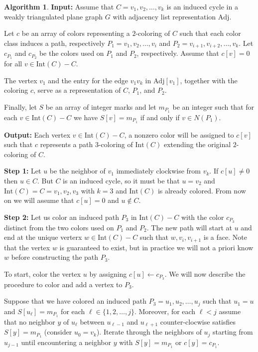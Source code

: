 \documentclass[12pt,letterpaper]{article}
\theoremstyle{plain}
\theoremstyle{definition}
\theoremstyle{break}
\newtheorem{algorithm}[lemma]{Algorithm}     %
\begin{document}
\begin{algorithm}\label{A:poh_linear}
\textbf{Input:} Assume that $C=v_1,v_2,\ldots,v_k$ is an induced cycle in a weakly
triangulated plane
    graph $G$ with adjacency list representation $\text{Adj}$.

Let $c$ be an array of colors
representing a $2$-coloring of $C$ such
that each color class induces a path, respectively $P_1=v_1,v_2,\ldots,v_i$ and
$P_2=v_{i+1},v_{i+2},\ldots,v_k$. Let $c_{P_1}$ and $c_{P_2}$ be the colors
used on $P_1$ and $P_2$, respectively. Assume that $c[v]=0$ for all
$v\in\text{Int}(C)-C$.

The vertex $v_1$ and the
entry for the edge $v_1v_k$ in $\text{Adj}[v_1]$, together with the
coloring $c$, serve as a representation of $C$, $P_1$, and $P_2$.

Finally, let $S$ be an array of integer marks and let $m_{P_1}$ be an integer
such that for each $v\in\text{Int}(C)-C$ we have $S[v]=m_{P_1}$ if and only if
$v\in N(P_1)$.

\textbf{Output:} Each vertex $v\in\text{Int}(C)-C$, a nonzero color will be
assigned to $c[v]$ such that $c$ represents a path $3$-coloring of
$\text{Int}(C)$ extending the original $2$-coloring of $C$.

\textbf{Step 1:} Let $u$ be the neighbor of $v_1$ immediately clockwise from
$v_k$. If $c[u]\ne 0$ then $u\in C$. But $C$ is an induced cycle, so
it must be that $u=v_2$ and $\text{Int}(C)=C=v_1,v_2,v_3$ with $k=3$ and
$\text{Int}(C)$ is already colored. From now on we will assume that $c[u]=0$ and
$u\not\in C$.

\textbf{Step 2:} Let us color an induced path $P_3$ in $\text{Int}(C)-C$ with the
color $c_{P_3}$ distinct
from the two colors used on
$P_1$ and $P_2$. The new path will start at $u$ and end at the unique verterx
$w\in\text{Int}(C)-C$ such that $w,v_i,v_{i+1}$ is a face. Note that the vertex $w$ is
guaranteed to exist, but in practice we will not a priori
know $w$ before constructing the path $P_3$.

To start, color the vertex $u$ by assigning $c[u]\leftarrow c_{P_3}$. We will
now describe the procedure to color and add a vertex to $P_3$.

Suppose
that we have colored an induced path
$P_3=u_1,u_2,\ldots,u_j$ such that $u_1=u$ and $S[u_\ell]=m_{P_1}$ for each
$\ell\in\{1,2,\ldots,j\}$. Moreover, for each $\ell<j$ assume that no neighbor $y$ of $u_\ell$
between $u_{\ell-1}$ and $u_{\ell +1}$ counter-clocwise satisfies
$S[y]=m_{P_1}$ (consider $u_0=v_k$). Iterate through the neighbors of $u_j$ starting from $u_{j-1}$ until
encountering a neighbor $y$ with $S[y]=m_{P_1}$ or $c[y]=c_{P_1}$.


\end{algorithm}
\end{document}
